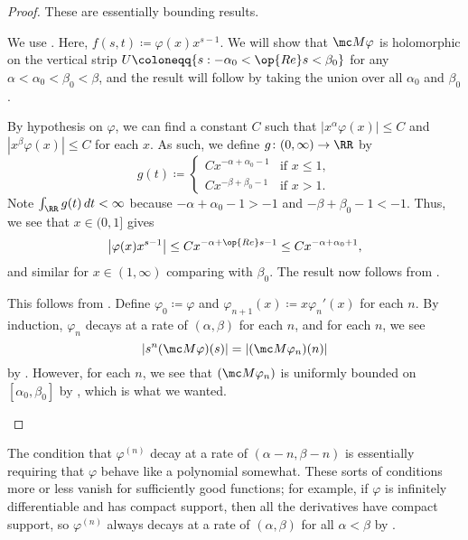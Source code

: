 \documentclass[../notes.tex]{subfiles}
\begin{document}
\begin{proof}
	These are essentially bounding results.
	\begin{listalph}
		\item We use . Here, $f(s,t)\coloneqq\varphi(x)x^{s-1}$. We will show that $\mc M\varphi$ is holomorphic on the vertical strip $U\coloneqq\{s:-\alpha_0<\op{Re}s<\beta_0\}$ for any $\alpha<\alpha_0<\beta_0<\beta$, and the result will follow by taking the union over all $\alpha_0$ and $\beta_0$.

		By hypothesis on $\varphi$, we can find a constant $C$ such that $\left|x^\alpha\varphi(x)\right|\le C$ and $\left|x^\beta\varphi(x)\right|\le C$ for each $x$. As such, we define $g\colon(0,\infty)\to\RR$ by
		\[g(t)\coloneqq\begin{cases}
			Cx^{-\alpha+\alpha_0-1} & \text{if }x\le1, \\
			Cx^{-\beta+\beta_0-1} & \text{if }x>1.
		\end{cases}\]
		Note $\int_\RR g(t)\,dt<\infty$ because $-\alpha+\alpha_0-1>-1$ and $-\beta+\beta_0-1<-1$. Thus, we see that $x\in(0,1]$ gives
		\[\left|\varphi(x)x^{s-1}\right|\le Cx^{-\alpha+\op{Re}s-1}\le Cx^{-\alpha+\alpha_0+1},\]
		and similar for $x\in(1,\infty)$ comparing with $\beta_0$. The result now follows from .
		\item This follows from . Define $\varphi_0\coloneqq\varphi$ and $\varphi_{n+1}(x)\coloneqq x\varphi_n'(x)$ for each $n$. By induction, $\varphi_n$ decays at a rate of $(\alpha,\beta)$ for each $n$, and for each $n$, we see
		\[\left|s^n(\mc M\varphi)(s)\right|=\left|(\mc M\varphi_n)(n)\right|\]
		by . However, for each $n$, we see that $(\mc M\varphi_n)$ is uniformly bounded on $[\alpha_0,\beta_0]$ by , which is what we wanted.
		\qedhere
	\end{listalph}
\end{proof}
\begin{remark} \label{rem:compact-support-has-decaying-derivs}
	The condition that $\varphi^{(n)}$ decay at a rate of $(\alpha-n,\beta-n)$ is essentially requiring that $\varphi$ behave like a polynomial somewhat. These sorts of conditions more or less vanish for sufficiently good functions; for example, if $\varphi$ is infinitely differentiable and has compact support, then all the derivatives have compact support, so $\varphi^{(n)}$ always decays at a rate of $(\alpha,\beta)$ for all $\alpha<\beta$ by .
\end{remark}
\end{document}
